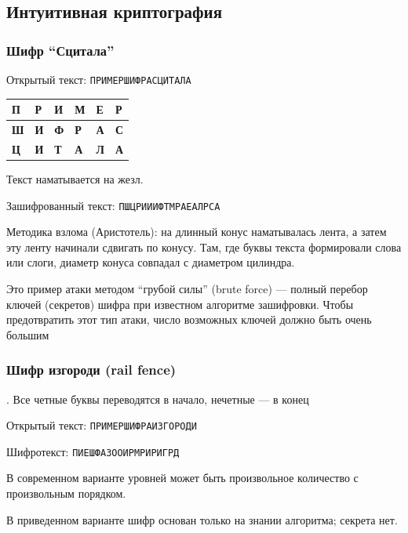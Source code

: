 \documentclass[a4paper, 14pt]{extarticle}
\begin{document}
\subsection{Интуитивная криптография}
\subsubsection{Шифр ``Сцитала''}

Открытый текст: \texttt{ПРИМЕРШИФРАСЦИТАЛА}

\begin{tabular}{|l|l|l|l|l|l|} %
\hline %
\textbf{П} & \textbf{Р} & \textbf{И} & \textbf{М} & \textbf{Е} & \textbf{Р} \\ \hline %
\textbf{Ш} & \textbf{И} & \textbf{Ф} & \textbf{Р} & \textbf{А} & \textbf{С} \\ \hline %
\textbf{Ц} & \textbf{И} & \textbf{Т} & \textbf{А} & \textbf{Л} & \textbf{А} \\ \hline %
\end{tabular}

Текст наматывается на жезл.

Зашифрованный текст: \texttt{ПШЦРИИИФТМРАЕАЛРСА}

Методика взлома (Аристотель): на длинный конус наматывалась лента, а затем эту ленту начинали сдвигать по конусу. Там, где буквы текста формировали слова или слоги, диаметр конуса совпадал с диаметром цилиндра.

Это пример атаки методом ``грубой силы'' (brute force) --- полный перебор ключей (секретов) шифра при известном алгоритме зашифровки. Чтобы предотвратить этот тип атаки, число возможных ключей должно быть очень большим

\subsubsection*{Шифр изгороди (rail fence)}. Все четные буквы переводятся в начало, нечетные --- в конец

Открытый текст: \texttt{ПРИМЕРШИФРАИЗГОРОДИ}


Шифротекст: \texttt{ПИЕШФАЗООИРМРИРИГРД}

В современном варианте уровней может быть произвольное количество с произвольным порядком.

В приведенном варианте шифр основан только на знании алгоритма; секрета нет.
\end{document}
